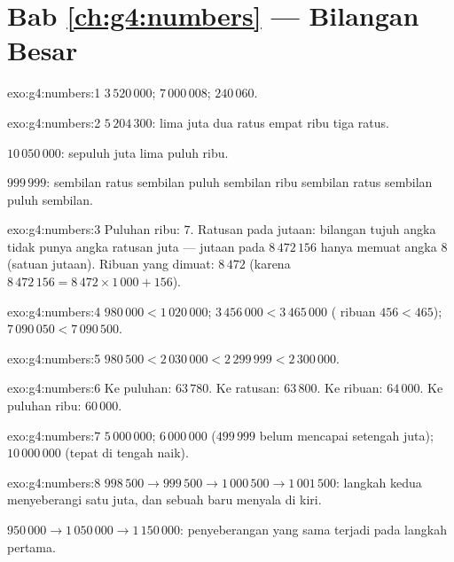 \section*{Bab \ref{ch:g4:numbers} --- Bilangan Besar}

\begin{solution}{exo:g4:numbers:1}
$3\,520\,000$; \quad $7\,000\,008$; \quad $240\,060$.
\end{solution}

\begin{solution}{exo:g4:numbers:2}
$5\,204\,300$: lima juta dua ratus empat ribu
tiga ratus.

$10\,050\,000$: sepuluh juta lima puluh ribu.

$999\,999$: sembilan ratus sembilan puluh sembilan ribu sembilan
ratus sembilan puluh sembilan.
\end{solution}

\begin{solution}{exo:g4:numbers:3}
Puluhan ribu: $7$. Ratusan pada  jutaan: bilangan tujuh angka
tidak punya angka ratusan juta ---  jutaan pada $8\,472\,156$
hanya memuat angka $8$ (satuan jutaan). Ribuan yang dimuat: $8\,472$
(karena $8\,472\,156 = 8\,472 \times 1\,000 + 156$).
\end{solution}

\begin{solution}{exo:g4:numbers:4}
$980\,000 < 1\,020\,000$; \quad
$3\,456\,000 < 3\,465\,000$ ( ribuan $456 < 465$); \quad
$7\,090\,050 < 7\,090\,500$.
\end{solution}

\begin{solution}{exo:g4:numbers:5}
$980\,500 < 2\,030\,000 < 2\,299\,999 < 2\,300\,000$.
\end{solution}

\begin{solution}{exo:g4:numbers:6}
Ke puluhan: $63\,780$. Ke ratusan: $63\,800$. Ke ribuan:
$64\,000$. Ke puluhan ribu: $60\,000$.
\end{solution}

\begin{solution}{exo:g4:numbers:7}
$5\,000\,000$; \quad $6\,000\,000$ ($499\,999$ belum mencapai
setengah juta); \quad $10\,000\,000$ (tepat di tengah  naik).
\end{solution}

\begin{solution}{exo:g4:numbers:8}
$998\,500 \to 999\,500 \to 1\,000\,500 \to 1\,001\,500$: langkah
kedua menyeberangi satu juta, dan sebuah  baru menyala di kiri.

$950\,000 \to 1\,050\,000 \to 1\,150\,000$: penyeberangan yang sama
terjadi pada langkah pertama.
\end{solution}

